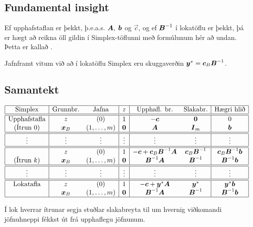 \subsection{Fundamental insight}
Ef upphafstaflan er þekkt, þ.e.a.s.  ${\mbox{\boldmath$A$}},\;{\mbox{\boldmath$b$}}$ og $\vec{c}$, og ef ${\mbox{\boldmath$B$}}^{-1}$ í lokatöflu er þekkt, þá er hægt að reikna öll gildin í Simplex-töflunni með formúlunum hér að undan. Þetta er kallað .

Jafnframt vitum við að í lokatöflu Simplex eru skuggaverðin ${\mbox{\boldmath$y$}}^*={\mbox{\boldmath$c$}}_B{\mbox{\boldmath$B$}}^{-1}$.

\subsection{Samantekt}
\begin{center}
{\renewcommand{\arraystretch}{1.5} \renewcommand{\tabcolsep}{0.2cm}
{\footnotesize
\[ \begin{array}{|c|cc|c|cc|c|}\hline 
  \textrm{Simplex}& \textrm{Grunnbr.} & \textrm{Jafna} & z & \textrm{Upphafl. br.} & \textrm{Slakabr.} & \textrm{Hægri hlið} \\ \hline\hline
\textrm{Upphafstafla} & z & (0) & 1 & -{\mbox{\boldmath$c$}} & {\mbox{\boldmath$0$}} & 0 \\
(\textrm{Ítrun }0) &  {\mbox{\boldmath$x$}}_B & (1,\ldots,m) & {\mbox{\boldmath$0$}} & {\mbox{\boldmath$A$}} & {\mbox{\boldmath$I$}}_m & {\mbox{\boldmath$b$}} \\ \hline\hline
\vdots & \vdots & \vdots & \vdots & \vdots & \vdots & \vdots \\ \hline \hline
 & z & (0) & 1 & -{\mbox{\boldmath$c$}}+{\mbox{\boldmath$c$}}_B{\mbox{\boldmath$B$}}^{-1}{\mbox{\boldmath$A$}} & {\mbox{\boldmath$c$}}_B{\mbox{\boldmath$B$}}^{-1} & {\mbox{\boldmath$c$}}_B{\mbox{\boldmath$B$}}^{-1}{\mbox{\boldmath$b$}} \\
(\textrm{Ítrun }k) &  {\mbox{\boldmath$x$}}_B & (1,\ldots,m) & {\mbox{\boldmath$0$}} & {\mbox{\boldmath$B$}}^{-1}{\mbox{\boldmath$A$}} & {\mbox{\boldmath$B$}}^{-1} & {\mbox{\boldmath$B$}}^{-1}{\mbox{\boldmath$b$}} \\ \hline\hline
\vdots & \vdots & \vdots & \vdots & \vdots & \vdots & \vdots \\ \hline \hline
\textrm{Lokatafla} & z & (0) & 1 & -{\mbox{\boldmath$c$}}+{\mbox{\boldmath$y$}}^*{\mbox{\boldmath$A$}} & {\mbox{\boldmath$y$}}^* & {\mbox{\boldmath$y$}}^*{\mbox{\boldmath$b$}} \\
 &  {\mbox{\boldmath$x$}}_B & (1,\ldots,m) & {\mbox{\boldmath$0$}} & {\mbox{\boldmath$B$}}^{-1}{\mbox{\boldmath$A$}} & {\mbox{\boldmath$B$}}^{-1} & {\mbox{\boldmath$B$}}^{-1}{\mbox{\boldmath$b$}} \\ \hline
 \end{array}\]
}}
\end{center}
Í lok hverrar ítrunar segja stuðlar slakabreyta til um hvernig viðkomandi jöfnuhneppi fékkst út frá upphaflegu jöfnunum.


